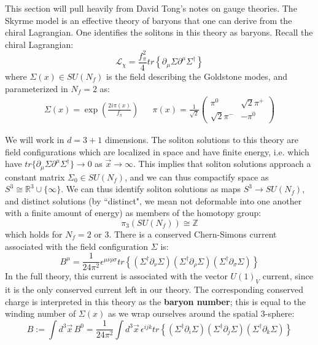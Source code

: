 \documentclass[11pt, oneside]{article}   	%
\theoremstyle{definition}
\begin{document}
This section will pull heavily from David Tong's notes on gauge theories. The Skyrme model is an effective theory of baryons that one can 
derive from the chiral Lagrangian. One identifies the solitons in this theory as baryons. Recall the chiral Lagrangian:
\begin{equation}
	\mathcal L_\chi = \frac{f_\pi^2}{4}tr\left\{\partial_\mu\Sigma\partial^\mu \Sigma^\dagger\right\}
\end{equation}
where $\Sigma(x)\in SU(N_f)$ is the field describing the Goldstone modes, and parameterized in $N_f = 2$ as:
\begin{align}
	\Sigma(x) = \exp\left(\frac{2i\pi(x)}{f_\pi}\right) && \pi(x) = \frac{1}{\sqrt 2} \begin{pmatrix}  \pi^0 & \sqrt 2 \pi^+ \\ \sqrt 2 \pi^- & - \pi^0 \end{pmatrix}
\end{align}

We will work in $d = 3 + 1$ dimensions. The soliton solutions to this theory are field configurations which are localized in space and have 
finite energy, i.e. which have $tr\{\partial_\mu\Sigma\partial^\mu\Sigma^\dagger\}\rightarrow 0$ as $\vec x\rightarrow\infty$. This implies that 
soliton solutions approach a constant matrix $\Sigma_0\in SU(N_f)$, and we can thus compactify space as $S^3\cong \mathbb R^3\cup 
\{\infty\}$. We can thus identify soliton solutions as maps $S^3\rightarrow SU(N_f)$, and distinct solutions (by ``distinct", we mean not 
deformable into one another with a finite amount of energy) as members of the homotopy group:
\begin{equation}
	\pi_3(SU(N_f))\cong\mathbb Z
\end{equation}
which holds for $N_f = 2$ or 3. There is a conserved Chern-Simons current associated with the field configuration $\Sigma$ is:
\begin{equation}
	B^\mu = \frac{1}{24\pi^2}\epsilon^{\mu\nu\rho\sigma} tr\left\{(\Sigma^\dagger \partial_\nu \Sigma) (\Sigma^\dagger \partial_\rho \Sigma)
	(\Sigma^\dagger \partial_\sigma \Sigma)\right\}
\end{equation}
In the full theory, this current is associated with the vector $U(1)_V$ current, since it is the only conserved current left in our theory. The 
corresponding conserved charge is interpreted in this theory as the \textbf{baryon number}; this is equal to the winding number 
of $\Sigma(x)$ as we wrap ourselves around the spatial 3-sphere:
\begin{equation}
	B := \int d^3\vec x\,B^0 = \frac{1}{24\pi^2} \int d^3\vec x\, \epsilon^{ijk} tr\left\{(\Sigma^\dagger \partial_i \Sigma) (\Sigma^\dagger 
	\partial_j \Sigma)(\Sigma^\dagger \partial_k \Sigma)\right\}
\end{equation} 
\end{document}
